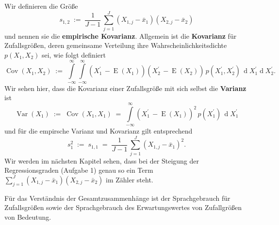 Wir definieren die Größe
\begin{equation}
s_{1,2} \; := \; \frac{1}{J-1} \, \sum_{j = 1}^J (X_{1,j} - \bar x_1)(X_{2,j} - \bar x_2)
\end{equation}
und nennen sie die \textbf{empirische Kovarianz}.
Allgemein ist die \textbf{Kovarianz} für Zufallsgrößen, deren gemeinsame Verteilung
ihre Wahrscheinlichkeitsdichte $p(X_1, X_2)$ sei, wie folgt definiert
\begin{equation}
\operatorname{Cov}(X_1, X_2) \; := \; 
\int\limits_{-\infty}^{\infty}\int\limits_{-\infty}^{\infty}
(X_1^\prime \, - \operatorname{E}(X_1))(X_2^\prime \, - \operatorname{E}(X_2)) \,
p(X_1^\prime, X_2^\prime) \, \operatorname{d} X_1^\prime \operatorname{d} X_2^\prime .
\end{equation}
Wir sehen hier, dass die Kovarianz einer Zufallsgröße mit sich selbst die
\textbf{Varianz} ist
\begin{equation}
\operatorname{Var}(X_1) \; := \;  \operatorname{Cov}(X_1, X_1) \; = \; 
\int\limits_{-\infty}^{\infty}
(X_1^\prime \, - \operatorname{E}(X_1))^2 \,
p(X_1^\prime) \, \operatorname{d} X_1^\prime
\end{equation}
und für die empirsche Varianz und Kovarianz gilt entsprechend
\begin{equation}
s_{1}^2 \; := \; s_{1,1} \; = \; 
\frac{1}{J-1} \, \sum_{j = 1}^J (X_{1,j} - \bar x_1)^2 .
\end{equation}
Wir werden im nächsten Kapitel sehen, dass bei der Steigung der Regressionsgraden
(Aufgabe 1) genau so ein Term $\sum_{j = 1}^J (X_{1,j} - \bar x_1)(X_{2,j} - \bar x_2)$
im Zähler steht.

Für das Verständnis der Gesamtzusammenhänge ist der Sprachgebrauch für Zufallsgrößen sowie
der Sprachgebrauch des Erwartungswertes von Zufallgrößen von Bedeutung. 

